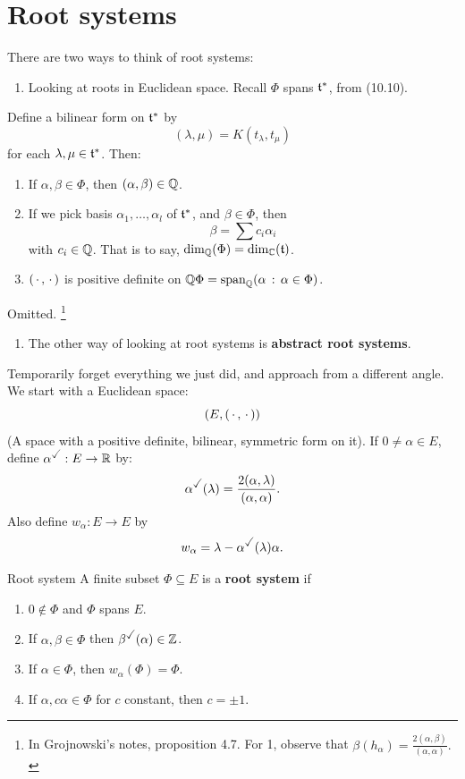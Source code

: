 \documentclass{article}
\begin{document}
\section{Root systems}
There are two ways to think of root systems: \begin{enumerate}
    \item[(a)] Looking at roots in Euclidean space. Recall $\Phi$ spans $\mathfrak{t}^{*}$, from (10.10).
\end{enumerate}
\begin{fancyprop}{}
    Define a bilinear form on $\mathfrak{t}^{*}$ by \[ (\lambda, \mu) = K(t_{\lambda},t_{\mu})\] for each $\lambda, \mu \in \mathfrak{t}^{*}$. Then: \begin{enumerate}
        \item If $\alpha, \beta \in \Phi$, then $(\alpha, \beta) \in \mathbb{Q}$.
        \item If we pick basis $\alpha_{1},\dots,\alpha_{l}$ of $\mathfrak{t}^{*}$, and $\beta \in \Phi$, then \[ \beta = \sum c_{i} \alpha_{i}\] with $c_{i} \in \mathbb{Q}$. That is to say, $\dim_{\mathbb{Q}}(\Phi) = \dim_{\mathbb{C}}(\mathfrak{t})$.
        \item $(\, \cdot \,, \, \cdot \,)$ is positive definite on $\mathbb{Q} \Phi = \operatorname{span}_{\mathbb{Q}}(\alpha \, : \, \alpha \in \Phi)$.
    \end{enumerate}
\end{fancyprop}
\proof Omitted. \footnote{In Grojnowski's notes, proposition 4.7. For 1, observe that $\beta(h_{\alpha}) = \frac{2(\alpha,\beta)}{(\alpha,\alpha)}.$}
\begin{enumerate}
    \item[(b)] The other way of looking at root systems is \textbf{abstract root systems}.
\end{enumerate}
Temporarily forget everything we just did, and approach from a different angle. We start with a Euclidean space: \[ (E, (\, \cdot \,, \, \cdot \,))\] (A space with a positive definite, bilinear, symmetric form on it). If $0 \neq \alpha \in E$, define $\alpha^{\checked} : E \to \bbR$ by: \[ \alpha^{\checked}(\lambda) = \frac{2(\alpha,\lambda)}{(\alpha, \alpha)}.\] Also define $w_{\alpha} : E \to E$ by \[ w_{\alpha} = \lambda - \alpha^{\checked}(\lambda)\alpha.\]
\begin{fancydefine}{Root system}
    A finite subset $\Phi \subseteq E$ is a \textbf{root system} if \begin{enumerate}
        \item $0 \notin \Phi$ and $\Phi$ spans $E$.
        \item If $\alpha, \beta \in \Phi$ then $\beta^{\checked}(\alpha) \in \bbZ$.
        \item If $\alpha \in \Phi$, then $w_{\alpha}(\Phi) = \Phi$.
        \item If $\alpha, c \alpha \in \Phi$ for $c$ constant, then $c= \pm 1$.
    \end{enumerate}
\end{fancydefine}
\end{document}
